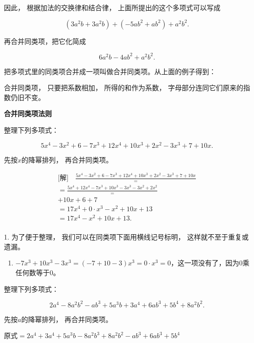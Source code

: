 因此， 根据加法的交换律和结合律， 上面所提出的这个多项式可以写成

\[
(3 a ^{2} b + 3 a ^{2} b) + (- 5 a b ^{2} + a b ^{2}) + a ^{2} b ^{2}.
\]

再合并同类项，把它化简成

\[
6 a ^{2} b - 4 a b ^{2} + a ^{2} b ^{2}.
\]

把多项式里的同类项合并成一项叫做合并同类项。从上面的例子得到：

合并同类项， 只要把系数相加， 所得的和作为系数，
字母部分连同它们原来的指数仍旧不变。

\textbf{合并同类项法则}

 整理下列多项式：

\[
5 x ^{4} - 3 x ^{2} + 6 - 7 x ^{3} + 12 x ^{4} + 10 x ^{3} + 2 x ^{2} - 3 x ^{3} + 7 + 10 x.
\]

 先按\(x\)的降幂排列， 再合并同类项。

\[
\begin{array}{l} \text{[解]} \quad \frac{5 x ^{4} - 3 x ^{2} + 6 - 7 x ^{3} + 12 x ^{4} + 10 x ^{3} + 2 x ^{2} - 3 x ^{3} + 7 + 10 x}{=} \\ = \frac{5 x ^{4} + 12 x ^{4} - 7 x ^{3} + 10 x ^{3} - 3 x ^{3} - 3 x ^{2} + 2 x ^{2}}{=} \\ + 10 x + 6 + 7 \\ = 17 x ^{4} + 0 \cdot x ^{3} - x ^{2} + 10 x + 13 \\ = 17 x ^{4} - x ^{2} + 10 x + 13. \\ \end{array}
\]

 1. 为了便于整理， 我们可以在同类项下面用横线记号标明，
这样就不至于重复或遗漏。

\begin{enumerate}[start=2]
\item
  \(-7x^{3} + 10x^{3} - 3x^{3} = (-7 + 10 - 3)x^{3} = 0 \cdot x^{3} = 0\)，这一项没有了，因为0乘任何数等于0。
\end{enumerate}

 整理下列多项式：

\[
2 a ^{4} - 8 a ^{2} b ^{2} - a b ^{3} + 5 a ^{3} b + 3 a ^{4} + 6 a b ^{3} + 5 b ^{4} + 8 a ^{2} b ^{2}.
\]

 先按\(a\)的降幂排列， 再合并同类项。

原式\(= 2a^{4} + 3a^{4} + 5a^{3}b - 8a^{2}b^{3} + 8a^{2}b^{2} - ab^{3} + 6ab^{3} + 5b^{4}\)

